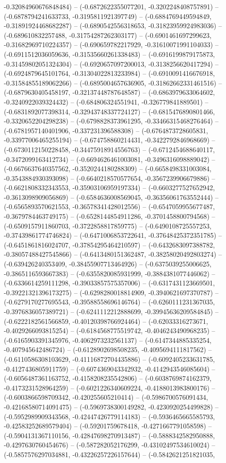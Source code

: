 -0.32084960676848484) -- (-0.6872622355077201, -0.3202248408757891) -- (-0.6878794241633733, -0.3195811921397749) -- (-0.6884769449594849, -0.31891924468682287) -- (-0.6890542556318653, -0.31823959924983036) -- (-0.689610832257488, -0.31754287262303177) -- (-0.6901461697299623, -0.31682969710224357) -- (-0.690659782217929, -0.31610071991104033) -- (-0.6911512036059636, -0.31535660261338483) -- (-0.6916199879175873, -0.31459802051324304) -- (-0.6920657097200013, -0.3138256620417294) -- (-0.6924879645101764, -0.31304022813233984) -- (-0.6910091416676918, -0.31584855189062266) -- (-0.6895004657636905, -0.31862662331461516) -- (-0.6879630405458197, -0.32137448787648587) -- (-0.6863979633064602, -0.3240922039324432) -- (-0.684806324551941, -0.326779841889501) -- (-0.6831892077398314, -0.32943748337724127) -- (-0.6815476890801466, -0.3320652204298238) -- (-0.6798828373961295, -0.33466315468276464) -- (-0.6781957140401906, -0.337231396588308) -- (-0.6764873728605831, -0.33977006465255194) -- (-0.674758860214431, -0.3422792846968669) -- (-0.6730112150228458, -0.34475918914556763) -- (-0.6712454688640117, -0.3472099163412734) -- (-0.6694626461003081, -0.3496316098889042) -- (-0.6676637640357562, -0.3520244180288309) -- (-0.6658498331003084, -0.3543884930393098) -- (-0.6640218570577654, -0.3567239906679886) -- (-0.6621808332343553, -0.35903106959197334) -- (-0.6603277527652942, -0.3613098909056869) -- (-0.6584636008569045, -0.36356061763552444) -- (-0.6565893570621553, -0.36578341428012556) -- (-0.6547059955677487, -0.3679784463749175) -- (-0.6528144854911286, -0.3701458800794568) -- (-0.6509157911860703, -0.3722858817859775) -- (-0.6490108725557253, -0.37439861774746824) -- (-0.6471006853722641, -0.37648425372351785) -- (-0.6451861816024707, -0.37854295464210597) -- (-0.6432683097388782, -0.38057488427545866) -- (-0.6413480151362487, -0.38258020492803274) -- (-0.639426240353409, -0.38455907713464926) -- (-0.6375039255006625, -0.3865116593667383) -- (-0.6355820085931999, -0.3884381077446062) -- (-0.6336614259111298, -0.39033857575357006) -- (-0.6317431123669501, -0.39221321396173275) -- (-0.6298280018814909, -0.3940621697370787) -- (-0.6279170277695543, -0.39588558696146764) -- (-0.6260111231367035, -0.3976836057389721) -- (-0.6241112212888699, -0.39945636209584845) -- (-0.6222182561566859, -0.40120398766924464) -- (-0.62033316273671, -0.4029266093815254) -- (-0.6184568775519742, -0.4046243490968235) -- (-0.6165903391345976, -0.4062973232561137) -- (-0.6147344885335254, -0.407945642486724) -- (-0.6128902698508235, -0.4095694111817562) -- (-0.6110586308103629, -0.41116872704435886) -- (-0.6092405233631785, -0.4127436805911759) -- (-0.6074369043342932, -0.4142943546085604) -- (-0.6056487361163752, -0.4158208235542806) -- (-0.6038769874162379, -0.4173231528964259) -- (-0.6021226340609224, -0.4188013983800176) -- (-0.6003866598709342, -0.420255605210414) -- (-0.5986700576091434, -0.42168580714091475) -- (-0.5969738300149282, -0.4230920254499828) -- (-0.5952989909343568, -0.42447426779114183) -- (-0.5936465665585793, -0.42583252689579404) -- (-0.59201759678418, -0.4271667791058598) -- (-0.5904131367110156, -0.42847698270913487) -- (-0.5888342582950888, -0.4297630760454676) -- (-0.587282052176299, -0.43102497534610024) -- (-0.5857576297034881, -0.43226257226157644) -- (-0.5842621251821035, 